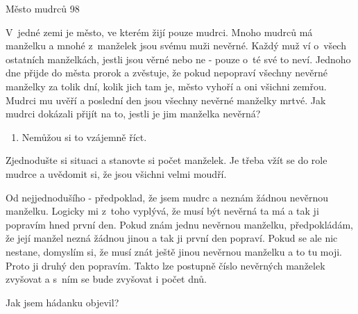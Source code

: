 Město mudrců
98 %

V~jedné zemi je město, ve kterém žijí pouze mudrci. Mnoho mudrců má manželku a mnohé z~manželek jsou svému muži nevěrné. Každý muž ví o~všech ostatních manželkách, jestli jsou věrné nebo ne - pouze o~té své to neví. Jednoho dne přijde do města prorok a zvěstuje, že pokud nepopraví všechny nevěrné manželky za tolik dní, kolik jich tam je, město vyhoří a oni všichni zemřou. Mudrci mu uvěří a poslední den jsou všechny nevěrné manželky mrtvé. Jak mudrci dokázali přijít na to, jestli je jim manželka nevěrná?

\begin{enumerate}
\item Nemůžou si to vzájemně říct.
\end{enumerate}

Zjednodušte si situaci a stanovte si počet manželek. Je třeba vžít se do role mudrce a uvědomit si, že jsou všichni velmi moudří.

Od nejjednodušího - předpoklad, že jsem mudrc a neznám žádnou nevěrnou manželku. Logicky mi z~toho vyplývá, že musí být nevěrná ta má a tak ji popravím hned první den. Pokud znám jednu nevěrnou manželku, předpokládám, že její manžel nezná žádnou jinou a tak ji první den popraví. Pokud se ale nic nestane, domyslím si, že musí znát ještě jinou nevěrnou manželku a to tu moji. Proto ji druhý den popravím. Takto lze postupně číslo nevěrných manželek zvyšovat a s~ním se bude zvyšovat i počet dnů.

Jak jsem hádanku objevil?
